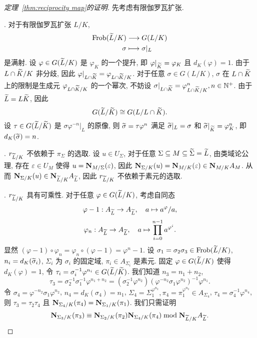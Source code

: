 \begin{proof}[定理~\ref{thm:reciprocity map}的证明]
先考虑有限伽罗瓦扩张.

.
对于有限伽罗瓦扩张 $L/K$,
  \[\begin{split}{\mathrm{Frob}}(\widetilde L/K) &\longrightarrow G(L/K) \\ \sigma &\longmapsto \sigma|_L\end{split}\]
是满射. 设 $\varphi\in G(\widetilde L/K)$ 是 $\varphi_K$ 的一个提升, 即 $\varphi|_{\widetilde K}=\varphi_K$ 且 $d_K(\varphi)=1$. 由于 $L\cap\widetilde K/K$ 非分歧, 因此 $\varphi|_{L\cap \widetilde K}=\varphi_{L\cap \widetilde K/K}$. 对于任意 $\sigma\in G(L/K)$, $\sigma$ 在 $L\cap \widetilde K$ 上的限制是生成元 $\varphi_{L\cap \widetilde K/K}$ 的一个幂次, 不妨设 $\sigma|_{L\cap \widetilde K}=\varphi_{L\cap \widetilde K/K}^n,n\in{\mathbb{N}}^+$. 由于 $\widetilde L=L\widetilde K$, 因此
  \[G(\widetilde L/\widetilde K)\cong G(L/L\cap \widetilde K).\]
设 $\tau\in G(\widetilde L/\widetilde K)$ 是 $\sigma\varphi^{-n}|_L$ 的原像, 则 $\widetilde\sigma=\tau\varphi^n$ 满足 $\widetilde\sigma|_L=\sigma$ 和 $\widetilde \sigma|_{\widetilde K}=\varphi_K^n$, 即 $d_K(\widetilde\sigma)=n$.

.
$r_{\widetilde L/K}$ 不依赖于 $\pi_\Sigma$ 的选取.
设 $u\in U_\Sigma$, 对于任意 $\Sigma\subseteq M\subseteq \widetilde\Sigma=\widetilde L$, 由类域论公理, 存在 $\varepsilon\in U_M$ 使得 $u={\mathbf{N}}_{M/\Sigma}(\varepsilon)$, 因此 ${\mathbf{N}}_{\Sigma/K}(u)={\mathbf{N}}_{M/K}(\varepsilon)\in{\mathbf{N}}_{M/K}A_M$. 从而 ${\mathbf{N}}_{\Sigma/K}(u)\in{\mathbf{N}}_{\widetilde L/K}A_{\widetilde L}$, 因此 $r_{\widetilde L/K}$ 不依赖于素元的选取.

.
$r_{\widetilde L/K}$ 具有可乘性. 对于任意 $\varphi\in G(\widetilde L/K)$, 考虑自同态
  \[\varphi-1:A_{\widetilde L}\to A_{\widetilde L},\quad a\mapsto a^\varphi/a,\]
  \[\varphi_n:A_{\widetilde L}\to A_{\widetilde L},\quad a\mapsto \prod_{i=0}^{n-1}a^{\varphi^i}.\]
显然 $(\varphi-1)\circ\varphi_n=\varphi_n\circ(\varphi-1)=\varphi^n-1$.
设 $\sigma_1=\sigma_2\sigma_3\in{\mathrm{Frob}}(\widetilde L/K)$, $n_i=d_K(\widetilde \sigma_i)$, $\Sigma_i$ 为 $\sigma_i$ 的固定域, $\pi_i\in A_{\Sigma_i}$ 是素元. 固定 $\varphi\in G(\widetilde L/K)$ 使得 $d_K(\varphi)=1$, 令 $\tau_i=\sigma_i^{-1}\varphi^{n_i}\in G(\widetilde L/\widetilde K)$. 我们知道 $n_3=n_1+n_2$,
  \[\tau_3=\sigma_2^{-1}\sigma_1^{-1}\varphi^{n_1+n_2}=(\sigma_2^{-1}\varphi^{n_2})(\varphi^{-n_2}\sigma_1\varphi^{n_2})^{-1}\varphi^{n_1}.\]
令 $\sigma_4=\varphi^{-n_2}\sigma_1\varphi^{n_2}$, $n_4=d_K(\sigma_4)=n_1$, $\Sigma_4=\Sigma_1^{\varphi^{n_2}},\pi_4=\pi_1^{\varphi^{n_2}}\in A_{\Sigma_4}$, $\tau_4=\sigma_4^{-1}\varphi^{n_4}$, 则 $\tau_3=\tau_2\tau_4$ 且 ${\mathbf{N}}_{\Sigma_4/K}(\pi_4)={\mathbf{N}}_{\Sigma_1/K}(\pi_1)$.
我们只需证明
  \[{\mathbf{N}}_{\Sigma_3/K}(\pi_3)\equiv {\mathbf{N}}_{\Sigma_2/K}(\pi_2){\mathbf{N}}_{\Sigma_4/K}(\pi_4)\bmod {\mathbf{N}}_{\widetilde L/K}A_{\widetilde L}.\]


\end{proof}
